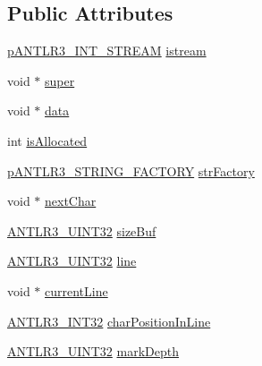 \subsection*{Public Attributes}
\begin{DoxyCompactItemize}
\item 
\hyperlink{antlr3interfaces_8h_af34d949f6aa442e8e7770e420977d338}{p\-A\-N\-T\-L\-R3\-\_\-\-I\-N\-T\-\_\-\-S\-T\-R\-E\-A\-M} \hyperlink{struct_a_n_t_l_r3___i_n_p_u_t___s_t_r_e_a_m__struct_ac90101686f579652c058d24f5a7bad35}{istream}
\item 
void $\ast$ \hyperlink{struct_a_n_t_l_r3___i_n_p_u_t___s_t_r_e_a_m__struct_a36f0bf6696f00e7b09745269c8c705d8}{super}
\item 
void $\ast$ \hyperlink{struct_a_n_t_l_r3___i_n_p_u_t___s_t_r_e_a_m__struct_adc08e8fb7a312429e31b667cf9c67386}{data}
\item 
int \hyperlink{struct_a_n_t_l_r3___i_n_p_u_t___s_t_r_e_a_m__struct_a6fb47df51fb05073a1d38877d6f0f16d}{is\-Allocated}
\item 
\hyperlink{antlr3interfaces_8h_a499a87287d582de04cf736f342b20692}{p\-A\-N\-T\-L\-R3\-\_\-\-S\-T\-R\-I\-N\-G\-\_\-\-F\-A\-C\-T\-O\-R\-Y} \hyperlink{struct_a_n_t_l_r3___i_n_p_u_t___s_t_r_e_a_m__struct_ad3de400db5b8a382e5f1973ac5db70c0}{str\-Factory}
\item 
void $\ast$ \hyperlink{struct_a_n_t_l_r3___i_n_p_u_t___s_t_r_e_a_m__struct_a782664088fb3999f4b152bf3e309bf7c}{next\-Char}
\item 
\hyperlink{antlr3defs_8h_ac41f744abd0fd25144b9eb9d11b1dfd1}{A\-N\-T\-L\-R3\-\_\-\-U\-I\-N\-T32} \hyperlink{struct_a_n_t_l_r3___i_n_p_u_t___s_t_r_e_a_m__struct_ae3b592e8fc40f7576b8ffd2125e26bb3}{size\-Buf}
\item 
\hyperlink{antlr3defs_8h_ac41f744abd0fd25144b9eb9d11b1dfd1}{A\-N\-T\-L\-R3\-\_\-\-U\-I\-N\-T32} \hyperlink{struct_a_n_t_l_r3___i_n_p_u_t___s_t_r_e_a_m__struct_a6339fbb583899850cc6647706c60f197}{line}
\item 
void $\ast$ \hyperlink{struct_a_n_t_l_r3___i_n_p_u_t___s_t_r_e_a_m__struct_a4c75e460ade15e43bd4628fac2430ac1}{current\-Line}
\item 
\hyperlink{antlr3defs_8h_a6faef5c4687f8eb633d2aefea93973ca}{A\-N\-T\-L\-R3\-\_\-\-I\-N\-T32} \hyperlink{struct_a_n_t_l_r3___i_n_p_u_t___s_t_r_e_a_m__struct_abe574b44337acb6550f27de7d80b8a08}{char\-Position\-In\-Line}
\item 
\hyperlink{antlr3defs_8h_ac41f744abd0fd25144b9eb9d11b1dfd1}{A\-N\-T\-L\-R3\-\_\-\-U\-I\-N\-T32} \hyperlink{struct_a_n_t_l_r3___i_n_p_u_t___s_t_r_e_a_m__struct_a849f32d3457ab4d006ed62f313431b42}{mark\-Depth}

\end{DoxyCompactItemize}
